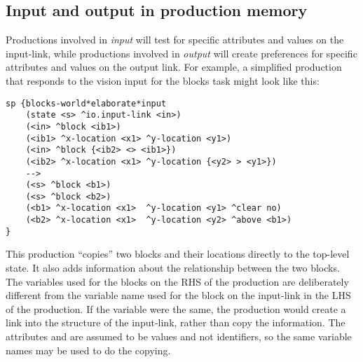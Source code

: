 

\subsection{Input and output in production memory}
\label{ADVANCED-io-pm}

Productions involved in \emph{input} will test for specific attributes and
values on the input-link, while productions involved in \emph{output} will
create preferences for specific attributes and values on the output link.
For example, a simplified production that responds to the vision input 
for the blocks task might look like this:

\begin{verbatim}
sp {blocks-world*elaborate*input
    (state <s> ^io.input-link <in>)
    (<in> ^block <ib1>)
    (<ib1> ^x-location <x1> ^y-location <y1>)
    (<in> ^block {<ib2> <> <ib1>})
    (<ib2> ^x-location <x1> ^y-location {<y2> > <y1>})
    -->
    (<s> ^block <b1>)
    (<s> ^block <b2>)
    (<b1> ^x-location <x1>  ^y-location <y1> ^clear no)
    (<b2> ^x-location <x1>  ^y-location <y2> ^above <b1>)
}
\end{verbatim}  \vspace{12pt}

This production ``copies'' two blocks and their locations directly to 
the top-level state. 
It also adds information about the
relationship between the two blocks.  The variables used
for the blocks on the RHS of the production are deliberately different from the
variable name used for the block on the input-link in the LHS of the
production. If the variable were the same, the production would create 
a link into the structure of the input-link, rather than copy the information.
The attributes  and
 are assumed to be values and not identifiers, so the same
variable names may be used to do the copying.


